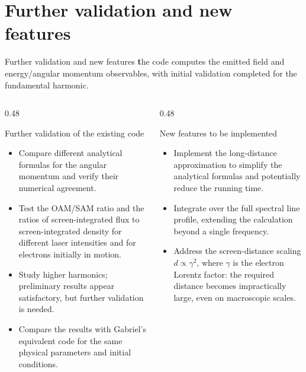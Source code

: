 \documentclass[aspectratio=169, 10pt]{beamer}
\newcommand{\theorylabel}[1]{{\color{ValidationTeal}\textbf{#1}}}
\begin{document}
\section{Further validation and new features}
\begin{frame}{Further validation and new features}
  \theorylabel the code computes the emitted field and energy/angular momentum observables,
  with initial validation completed for the fundamental harmonic.
  \par\medskip
  \begin{columns}[T,onlytextwidth]
    \begin{column}{0.48\textwidth}
      \begin{block}{Further validation of the existing code}
        \begin{itemize}
          \item Compare different analytical formulas for the angular momentum and verify their numerical agreement.
          \item Test the OAM/SAM ratio and the ratios of screen-integrated flux to screen-integrated density
            for different laser intensities and for electrons initially in motion.
          \item Study higher harmonics; preliminary results appear satisfactory, but further validation is needed.
          \item Compare the results with Gabriel's equivalent code for the same physical parameters and initial conditions.
        \end{itemize}
      \end{block}
    \end{column}
    \begin{column}{0.48\textwidth}
      \begin{block}{New features to be implemented}
        \begin{itemize}
          \item Implement the long-distance approximation to simplify the analytical formulas and potentially reduce the running time.
          \item Integrate over the full spectral line profile, extending the calculation beyond a single frequency.
          \item Address the screen-distance scaling $d\propto\gamma^2$, where $\gamma$ is the electron Lorentz factor:
            the required distance becomes impractically large, even on macroscopic scales.
        \end{itemize}
      \end{block}
    \end{column}
  \end{columns}
\end{frame}
\end{document}
